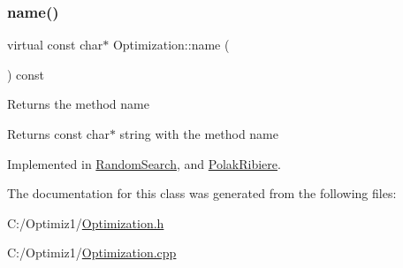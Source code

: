 \subsubsection{\texorpdfstring{name()}{name()}}
{\footnotesize\ttfamily virtual const char$\ast$ Optimization\+::name (\begin{DoxyParamCaption}{ }\end{DoxyParamCaption}) const\hspace{0.3cm}{\ttfamily [pure virtual]}}

Returns the method name \begin{DoxyReturn}{Returns}
const char$\ast$ string with the method name 
\end{DoxyReturn}


Implemented in \hyperlink{class_random_search_ae7fa0aba388b4fb39aa2aa4808575d1b}{Random\+Search}, and \hyperlink{class_polak_ribiere_a2a69c824b56e097a012d32c97ab021fd}{Polak\+Ribiere}.



The documentation for this class was generated from the following files\+:\begin{DoxyCompactItemize}
\item 
C\+:/\+Optimiz1/\hyperlink{_optimization_8h}{Optimization.\+h}\item 
C\+:/\+Optimiz1/\hyperlink{_optimization_8cpp}{Optimization.\+cpp}\end{DoxyCompactItemize}
